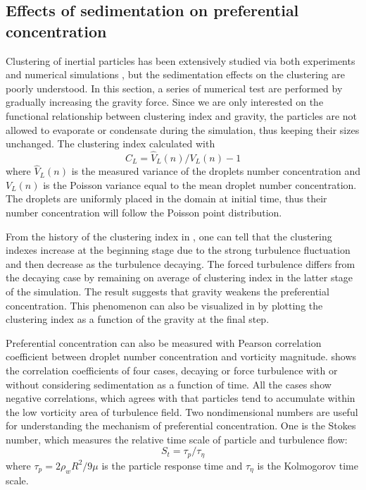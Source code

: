 \subsection{Effects of sedimentation on preferential concentration }\label{sedimentation}
Clustering of inertial particles has been extensively studied via both 
experiments and numerical simulations \cite{SUNDARAM1997Collision, Reade2000Effect}, but the sedimentation effects on the clustering are poorly understood. In this section, a series of numerical test are performed by gradually increasing the gravity force. Since we are only interested on the functional relationship between clustering index and gravity, the particles are not allowed to evaporate or condensate during the simulation, thus keeping their sizes unchanged.  The clustering index calculated with \cite{Vaillancourt2002}
\begin{equation}
C_L = \hat{V}_L(n)/V_L(n)-1
\label{eq:cluster_index}
\end{equation}
where $\hat{V}_L(n)$ is the measured variance of the droplets number concentration and $V_L(n)$ is the Poisson variance equal to the mean droplet number concentration. The droplets are uniformly placed in the domain at initial time, thus their number concentration will follow the Poisson point distribution.

From the history of the clustering index in , one can tell that the clustering indexes increase at the beginning stage due to the strong turbulence fluctuation and then decrease as the turbulence decaying. The forced turbulence differs from the decaying case by remaining on average of clustering index in the latter stage of the simulation. The result suggests that gravity weakens the preferential concentration. This phenomenon can also be visualized in  by plotting the clustering index as a function of the gravity at the final step. 

Preferential concentration can also be measured with Pearson correlation coefficient between droplet number concentration and vorticity magnitude.  shows the correlation coefficients of four cases, decaying or force turbulence with or without considering sedimentation as a function of time. All the cases show negative correlations, which agrees with that particles tend to accumulate within the low vorticity area of turbulence field. Two nondimensional numbers are useful for understanding the mechanism of preferential concentration. One is the Stokes number, which measures the relative time scale of particle and turbulence flow:
\begin{equation}
S_t = \tau_p/\tau_{\eta}
\end{equation}
where $\tau_p = 2\rho_wR^2/9\mu$ is the particle response time and $\tau_{\eta}$ is the Kolmogorov time scale. 

